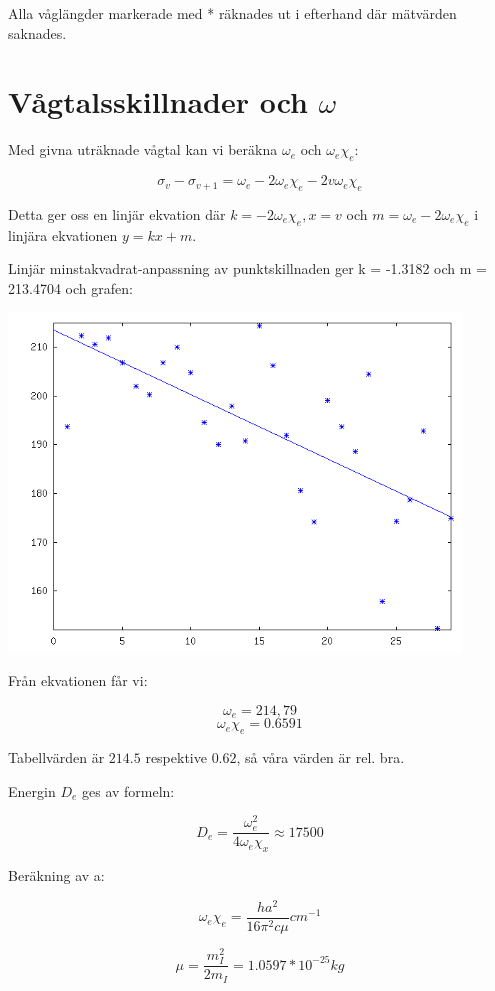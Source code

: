 \documentclass[a4paper,10pt]{article}
\begin{document}
Alla våglängder markerade med * räknades ut i efterhand där mätvärden saknades.

\newpage

\section{Vågtalsskillnader och $\omega$}

Med givna uträknade vågtal kan vi beräkna $\omega_e$ och $\omega_e\chi_e$:

$$ \sigma_v - \sigma_{v+1} = \omega_e - 2\omega_e\chi_e - 2v\omega_e\chi_e $$

Detta ger oss en linjär ekvation där $k = -2\omega_e\chi_e, x = v $ och $ m = \omega_e - 2\omega_e\chi_e $ i linjära ekvationen $y=kx+m$.

Linjär minstakvadrat-anpassning av punktskillnaden ger k = -1.3182 och m = 213.4704 och grafen:

\begin{center}
\includegraphics[width=120mm]{als-fit}
\end {center}

Från ekvationen får vi:

$$ \omega_e = 214,79 $$
$$ \omega_e\chi_e = 0.6591 $$

Tabellvärden är $214.5$ respektive $0.62$, så våra värden är rel. bra.

Energin $D_e$ ges av formeln:

$$D_e = \frac{\omega_e^2}{4\omega_e\chi_x} \approx 17500 $$

Beräkning av a:

$$ \omega_e\chi_e = \frac{ha^2}{16\pi^2c\mu} cm^{-1} $$

$$ \mu = \frac{m_I^2}{2m_I} = 1.0597*10^{-25} kg$$
\end{document}
